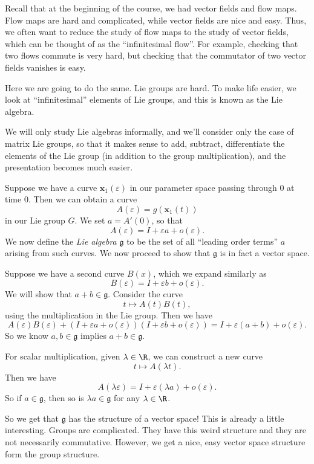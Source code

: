 \documentclass[a4paper]{article}
\begin{document}
Recall that at the beginning of the course, we had vector fields and flow maps. Flow maps are hard and complicated, while vector fields are nice and easy. Thus, we often want to reduce the study of flow maps to the study of vector fields, which can be thought of as the ``infinitesimal flow''. For example, checking that two flows commute is very hard, but checking that the commutator of two vector fields vanishes is easy.

Here we are going to do the same. Lie groups are hard. To make life easier, we look at ``infinitesimal'' elements of Lie groups, and this is known as the Lie algebra.

We will only study Lie algebras informally, and we'll consider only the case of matrix Lie groups, so that it makes sense to add, subtract, differentiate the elements of the Lie group (in addition to the group multiplication), and the presentation becomes much easier.

Suppose we have a curve $\mathbf{x}_1(\varepsilon)$ in our parameter space passing through $0$ at time $0$. Then we can obtain a curve
\[
  A(\varepsilon) = g(\mathbf{x}_1(t))
\]
in our Lie group $G$. We set $a = A'(0)$, so that
\[
  A(\varepsilon) = I + \varepsilon a + o(\varepsilon).
\]
We now define the \emph{Lie algebra} $\mathfrak{g}$ to be the set of all ``leading order terms'' $a$ arising from such curves. We now proceed to show that $\mathfrak{g}$ is in fact a vector space.

Suppose we have a second curve $B(x)$, which we expand similarly as
\[
  B(\varepsilon) = I + \varepsilon b + o (\varepsilon).
\]
We will show that $a + b \in \mathfrak{g}$. Consider the curve
\[
  t \mapsto A(t) B(t),
\]
using the multiplication in the Lie group. Then we have
\[
  A(\varepsilon)B(\varepsilon) + (I + \varepsilon a + o(\varepsilon)) (I + \varepsilon b + o(\varepsilon)) = I + \varepsilon(a + b) + o (\varepsilon).
\]
So we know $a, b \in \mathfrak{g}$ implies $a + b \in \mathfrak{g}$.

For scalar multiplication, given $\lambda \in \R$, we can construct a new curve
\[
  t \mapsto A(\lambda t).
\]
Then we have
\[
  A(\lambda \varepsilon) = I + \varepsilon (\lambda a) + o(\varepsilon).
\]
So if $a \in \mathfrak{g}$, then so is $\lambda a \in \mathfrak{g}$ for any $\lambda \in \R$.

So we get that $\mathfrak{g}$ has the structure of a vector space! This is already a little interesting. Groups are complicated. They have this weird structure and they are not necessarily commutative. However, we get a nice, easy vector space structure form the group structure.
\end{document}
